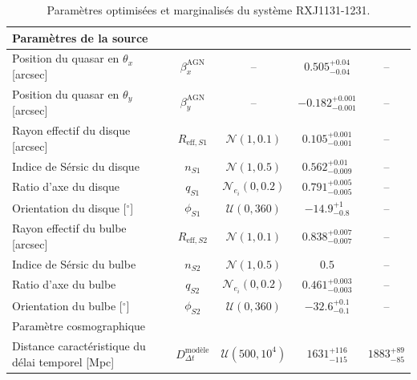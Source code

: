 \documentclass[times,10pt,twocolumn]{article}
\begin{document}
\begin{table}[hb]
\begin{tabular}{lcccc}
\midrule
Paramètres de la source \\
\midrule
Position du quasar en $\theta_x$ [arcsec] & 
        $\beta_x^{\mathrm{AGN}}$ & 
           --     &
        $0.505^{+0.04}_{-0.04}$ & 
--        \\[1ex]
Position du quasar en $\theta_y$ [arcsec] & 
        $\beta_y^{\mathrm{AGN}}$ & 
             --                    &
        $-0.182^{+0.001}_{-0.001}$ &
  --      \\[1ex]
Rayon effectif du disque [arcsec] & 
        $R_{\mathrm{eff}, S1}$ & 
        $\mathcal{N}(1, 0.1)$ & 
        $0.105^{+0.001}_{-0.001}$ & 
    --    \\[1ex]
Indice de Sérsic du disque & 
        $n_{S1}$ & 
        $\mathcal{N}(1, 0.5)$ & 
        $0.562^{+0.01}_{-0.009}$ & 
      --  \\[1ex]
Ratio d'axe du disque & 
        $q_{S1}$ & 
        $\mathcal{N}_{e_i}(0, 0.2)$ & 
        $0.791^{+0.005}_{-0.005}$ &
 --       \\[1ex]
Orientation du disque [$^{\circ}$]&
        $\phi_{S1}$ & 
        $\mathcal{U}(0, 360)$ & 
        $-14.9^{+1}_{-0.8}$ & 
   --     \\[1ex]
Rayon effectif du bulbe [arcsec] & 
        $R_{\mathrm{eff}, S2}$ & 
        $\mathcal{N}(1, 0.1)$ & 
        $0.838^{+0.007}_{-0.007}$ & 
    --    \\[1ex]
Indice de Sérsic du bulbe & 
        $n_{S2}$ & 
        $\mathcal{N}(1, 0.5)$ & 
        $0.5$ & 
    --    \\[1ex]
Ratio d'axe du bulbe & 
        $q_{S2}$ & 
        $\mathcal{N}_{e_i}(0, 0.2)$ & 
        $0.461^{+0.003}_{-0.003}$ &
     --   \\[1ex]
Orientation du bulbe [$^{\circ}$]&
        $\phi_{S2}$ & 
        $\mathcal{U}(0, 360)$ & 
        $-32.6^{+0.1}_{-0.1}$ & 
     --   \\[1ex]
\midrule
Paramètre cosmographique \\
\midrule
Distance caractéristique du délai temporel [Mpc]& 
        $D_{\Delta t}^{\text{modèle}}$ & 
        $\mathcal{U}(500, 10^4)$ & 
        $1631^{+116}_{-115}$ & 
        $1883^{+89}_{-85}$\\[1ex]
\bottomrule
\bottomrule
        \end{tabular}
        \caption{Paramètres optimisées et marginalisés du système RXJ1131-1231.}
        \label{tab:results}
\end{table}
\end{document}
